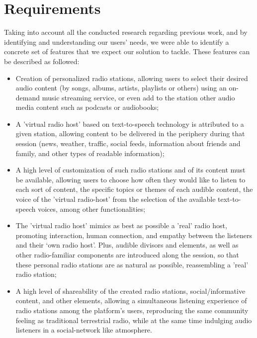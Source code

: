 \section{Requirements} 
\label{sec:req}

Taking into account all the conducted research regarding previous work, and by identifying and understanding our users' needs, we were able to identify a concrete set of features that we expect our solution to tackle. These features can be described as followed:

\begin{itemize}
	\item Creation of personalized radio stations, allowing users to select their desired audio content (by songs, albums, artists, playlists or others) using an on-demand music streaming service, or even add to the station other audio media content such as podcasts or audiobooks;
	\item A 'virtual radio host' based on text-to-speech technology is attributed to a given station, allowing content to be delivered in the periphery during that session (news, weather, traffic, social feeds, information about friends and family, and other types of readable information);
	\item A high level of customization of such radio stations and of its content must be available, allowing users to choose how often they would like to listen to each sort of content, the specific topics or themes of each audible content, the voice of the 'virtual radio-host' from the selection of the available text-to-speech voices, among other functionalities;
	\item The 'virtual radio host' mimics as best as possible a 'real' radio host, promoting interaction, human connection, and empathy between the listeners and their ‘own radio host’. Plus, audible divisors and elements, as well as other radio-familiar components are introduced along the session, so that these personal radio stations are as natural as possible, reassembling a 'real' radio station;
	\item A high level of shareability of the created radio stations, social/informative content, and other elements, allowing a simultaneous listening experience of radio stations among the platform's users, reproducing the same community feeling as traditional terrestrial radio, while at the same time indulging audio listeners in a social-network like atmosphere.
\end{itemize}

